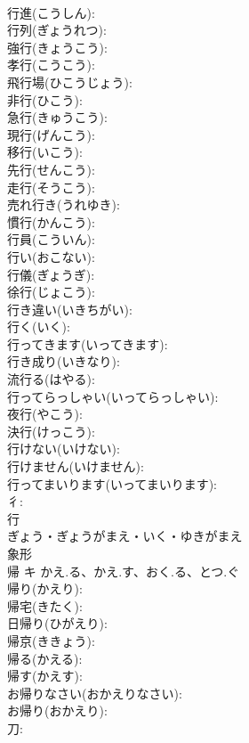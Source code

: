 \documentclass[8pt]{extreport}
\begin{document}
\begin{CJK}{UTF8}{min}
\\	行進(こうしん): 
\\	行列(ぎょうれつ): 
\\	強行(きょうこう): 
\\	孝行(こうこう): 
\\	飛行場(ひこうじょう): 
\\	非行(ひこう): 
\\	急行(きゅうこう): 
\\	現行(げんこう): 
\\	移行(いこう): 
\\	先行(せんこう): 
\\	走行(そうこう): 
\\	売れ行き(うれゆき): 
\\	慣行(かんこう): 
\\	行員(こういん): 
\\	行い(おこない): 
\\	行儀(ぎょうぎ): 
\\	徐行(じょこう): 
\\	行き違い(いきちがい): 
\\	行く(いく): 
\\	行ってきます(いってきます): 
\\	行き成り(いきなり): 
\\	流行る(はやる): 
\\	行ってらっしゃい(いってらっしゃい): 
\\	夜行(やこう): 
\\	決行(けっこう): 
\\	行けない(いけない): 
\\	行けません(いけません): 
\\	行ってまいります(いってまいります): 
\\	彳: 
\\	行	
\\	ぎょう・ぎょうがまえ・いく・ゆきがまえ	
\\	象形 
\\	帰	キ	かえ.る、かえ.す、おく.る、とつ.ぐ		
\\	帰り(かえり): 
\\	帰宅(きたく): 
\\	日帰り(ひがえり): 
\\	帰京(ききょう): 
\\	帰る(かえる): 
\\	帰す(かえす): 
\\	お帰りなさい(おかえりなさい): 
\\	お帰り(おかえり): 
\\	刀: 

\end{CJK}
\end{document}
